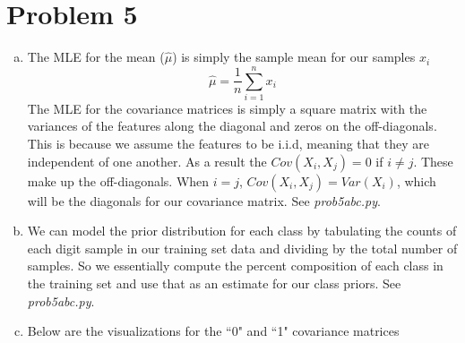 \documentclass{article}
\begin{document}
\section*{Problem 5}
\begin{enumerate}[a)]
  \item The MLE for the mean ($\hat{\mu}$) is simply the sample mean for our samples $x_i$
    $$\hat{\mu} = \frac{1}{n} \sum\limits_{i=1}^n x_i$$
    The MLE for the covariance matrices is simply a square matrix with the variances of the features along the diagonal and zeros on the off-diagonals. This is because we assume the features to be i.i.d, meaning that they are independent of one another. As a result the $Cov(X_i, X_j) = 0$ if $i \neq j$. These make up the off-diagonals. When $i=j$, $Cov(X_i, X_j) = Var(X_i)$, which will be the diagonals for our covariance matrix. See \textit{prob5abc.py}.
  \item We can model the prior distribution for each class by tabulating the counts of each digit sample in our training set data and dividing by the total number of samples. So we essentially compute the percent composition of each class in the training set and use that as an estimate for our class priors. See \textit{prob5abc.py}.
  \item Below are the visualizations for the ``0" and ``1" covariance matrices


\end{enumerate}
\end{document}
